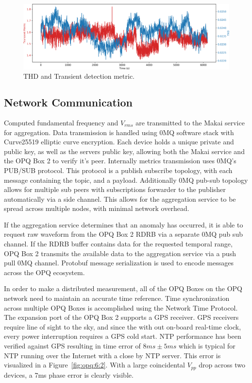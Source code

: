 \begin{figure}[h]
	\begin{center}
		\includegraphics[width=1\textwidth]{img/trans_thd_det.pdf}
	\end{center}
	\caption{THD and Transient detection metric.}
	\label{fig:opq:9}
\end{figure}

\subsection{Network Communication}\label{subsec:network-communication}

Computed fundamental frequency and $V_{rms}$ are transmitted to the Makai service for aggregation.
Data transmission is handled using 0MQ software stack with Curve25519 elliptic curve encryption.
Each device holds a unique private and public key, as well as the servers public key, allowing both the Makai service and the OPQ Box 2 to verify it's peer.
Internally metrics transmission uses 0MQ's PUB/SUB protocol.
This protocol is a publish subscribe topology, with each message containing the topic, and a payload.
Additionally 0MQ pub-sub topology allows for multiple sub peers with subscriptions forwarder to the publisher automatically via a side channel.
This allows for the aggregation service to be spread across multiple nodes, with minimal network overhead.

If the aggregation service determines that an anomaly has occurred, it is able to request raw waveform from the OPQ Box 2 RDRB via a separate 0MQ pub sub channel.
If the RDRB buffer contains data for the requested temporal range, OPQ Box 2 transmits the available data to the aggregation service via a push pull 0MQ channel.
Protobuf message serialization is used to encode messages across the OPQ ecosystem.


In order to make a distributed measurement, all of the OPQ Boxes on the OPQ network need to maintain an accurate time reference.
Time synchronization across multiple OPQ Boxes is accomplished using the Network Time Protocol.
The expansion port of the OPQ Box 2 supports a GPS receiver.
GPS receivers require line of sight to the sky, and since the with out on-board real-time clock, every power interruption requires a GPS cold start.
NTP performance has been verified against GPS resulting in time error of $8ms\pm 5ms$ which is typical for NTP running over the Internet with a close by NTP server.
This error is visualized in a Figure~\ref{fig:opq:6:2}.
With a large coincidental $V_{pp}$ drop across two devices, a 7ms phase error is clearly visible.


